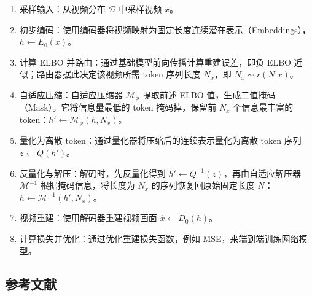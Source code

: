 \begin{enumerate}
\def\labelenumi{\arabic{enumi}.}
\tightlist
\item
  采样输入：从视频分布 \(\mathcal{D}\) 中采样视频 \(x\)。
\item
  初步编码：使用编码器将视频映射为固定长度连续潜在表示（Embeddings），\(h\leftarrow E_0(x)\)。
\item
  计算 ELBO 并路由：通过基础模型前向传播计算重建误差，即负 ELBO 近似；路由器据此决定该视频所需 token 序列长度 \(N_x\)，即 \(N_x\sim r(N|x)\)。
\item
  自适应压缩：自适应压缩器 \(\mathcal{M}_\phi\) 提取前述 ELBO 值，生成二值掩码（Mask）。它将信息量最低的 token 掩码掉，保留前 \(N_x\) 个信息最丰富的 token：\(h'\leftarrow\mathcal{M}_\phi(h,N_x)\)。
\item
  量化为离散 token：通过量化器将压缩后的连续表示量化为离散 token 序列 \(z\leftarrow Q(h')\)。
\item
  反量化与解压：解码时，先反量化得到 \(h'\leftarrow Q^{-1}(z)\)，再由自适应解压器 \(\mathcal{M}^{-1}\) 根据掩码信息，将长度为 \(N_x\) 的序列恢复回原始固定长度 \(N\)：\(h\leftarrow \mathcal{M}^{-1}(h',N_x)\)。
\item
  视频重建：使用解码器重建视频画面 \(\hat{x}\leftarrow D_0(h)\)。
\item
  计算损失并优化：通过优化重建损失函数，例如 MSE，来端到端训练网络模型。
\end{enumerate}

\hypertarget{ux53c2ux8003ux6587ux732e-140}{%
\subsection{参考文献}\label{ux53c2ux8003ux6587ux732e-140}}

